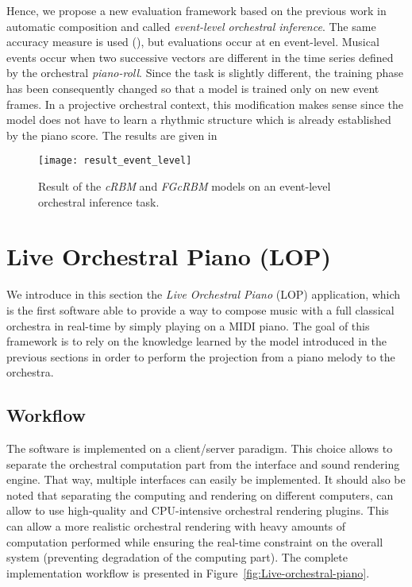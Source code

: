 \documentclass[letterpaper]{article}
\begin{document}
Hence, we propose a new evaluation framework based on the previous work in automatic composition and called \textit{event-level orchestral inference}. The same accuracy measure is used (), but evaluations occur at en event-level. Musical events occur when two successive vectors are different in the time series defined by the orchestral \textit{piano-roll}. Since the task is slightly different, the training phase has been consequently changed so that a model is trained only on new event frames.
In a projective orchestral context, this modification makes sense since the model does not have to learn a rhythmic structure which is already established by the piano score. The results are given in 

\begin{figure}
\centering
\texttt{[image: result\_event\_level]}
\caption{Result of the \textit{cRBM} and \textit{FGcRBM} models on an event-level orchestral inference task.}
\label{fig:result_event_level}
\end{figure}

\section{Live Orchestral Piano (LOP)}

We introduce in this section the \emph{Live Orchestral Piano} (LOP)
application, which is the first software able to provide a way to
compose music with a full classical orchestra in real-time by simply
playing on a MIDI piano. The goal of this framework is to rely on
the knowledge learned by the model introduced in the previous sections
in order to perform the projection from a piano melody to the orchestra.


\subsection{Workflow}

The software is implemented on a client/server paradigm. This choice
allows to separate the orchestral computation part from the interface
and sound rendering engine. That way, multiple interfaces can easily
be implemented. It should also be noted that separating the computing
and rendering on different computers, can allow to use high-quality
and CPU-intensive orchestral rendering plugins. This can allow a more
realistic orchestral rendering with heavy amounts of computation performed
while ensuring the real-time constraint on the overall system (preventing
degradation of the computing part). The complete implementation workflow
is presented in Figure~\ref{fig:Live-orchestral-piano}.
\end{document}
